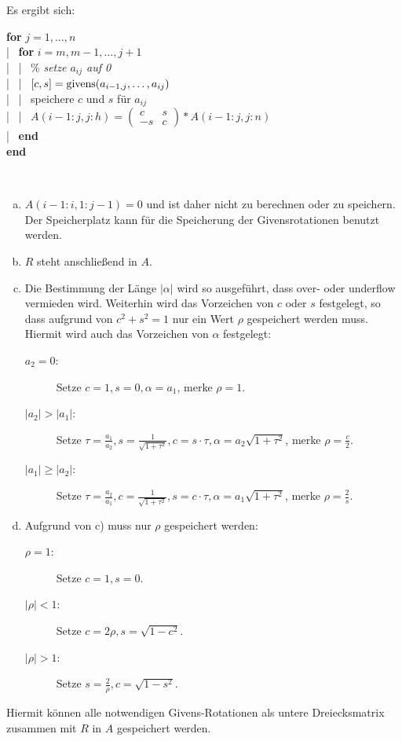 Es ergibt sich:

 

\begin{pseudocode}{0.7\linewidth}
  \textbf{for} $j=1, \dotsc , n$ \\
  |~	\>	\textbf{for} $i=m, m-1, \dotsc , j+1$ \\
  |~	\>		|~	\>\% \textit{setze $a_{ij}$ auf 0} \\
  |~	\>		|~	\>$[c,s] = \operatorname{givens}(a_{i-1,j}, \dotsc, a_{ij}) $\\
  |~	\>		|~	\>speichere $c$ und $s$ für $a_{ij}$ \\
  |~	\>		|~	\>$A(i-1:j, j:h) = \left(
    \begin{smallmatrix}c & s\\-s & c \end{smallmatrix}
  \right) * A(i-1:j, j:n)$ \\
  |~	\> \textbf{end}\\
  \textbf{end}							
\end{pseudocode}


\begin{Beme}~
  \begin{enumerate}[a)]
  \item $A(i-1 : i, 1 : j-1) = 0$ und ist daher nicht zu berechnen oder
    zu speichern. Der Speicherplatz kann für die Speicherung der
    Givensrotationen benutzt werden.
  \item  $R$ steht anschließend in $A$.
  \item Die Bestimmung der Länge $|\alpha|$ wird so ausgeführt, dass over-
    oder underflow vermieden wird. Weiterhin wird das Vorzeichen
    von $c$ oder $s$ festgelegt, so dass aufgrund von $c^2+s^2=1$ nur
    ein Wert $\rho$ gespeichert werden muss. Hiermit wird auch das
    Vorzeichen von $\alpha$ festgelegt:
    \begin{description}
    \item[$a_2=0$:] Setze $c=1, s=0, \alpha = a_1$, merke $\rho=1$.
    \item[$|a_2|>|a_1|$:] Setze 
      $\tau= \frac{a_1}{a_2}, s=\frac{1}{\sqrt{1+\tau^2}}, 
      c=s\cdot\tau, \alpha =a_2\sqrt{1+\tau^2}$, 
      merke $\rho=\frac{c}{2}$.
    \item[$|a_1|\geq|a_2|$:] Setze 
      $\tau= \frac{a_2}{a_1}, c=\frac{1}{\sqrt{1+\tau^2}}, 
      s=c\cdot\tau, \alpha =a_1\sqrt{1+\tau^2}$, 
      merke $\rho=\frac{2}{s}$.
    \end{description}
  \item Aufgrund von c) muss nur $\rho$ gespeichert werden:
    \begin{description}
    \item[$\rho=1$:] Setze $c=1, s=0$.
    \item[$|\rho|<1$:] Setze $c=2\rho , s= \sqrt{1-c^2}$.
    \item[$|\rho|>1$:] Setze $s=\frac{2}{\rho}, c=\sqrt{1-s^2}$.
    \end{description}
  \end{enumerate}
  Hiermit können alle notwendigen Givens-Rotationen als untere
  Dreiecksmatrix zusammen mit $R$ in $A$ gespeichert werden.
\end{Beme}



